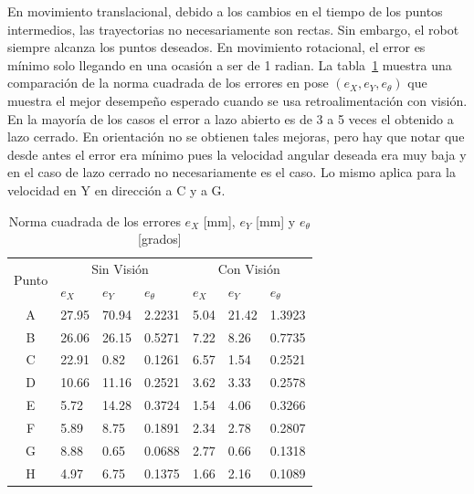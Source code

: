 \documentclass[twocolumn,10pt]{amrob}
\begin{document}
En movimiento translacional, debido a los cambios en el tiempo de los puntos intermedios, las trayectorias no necesariamente son rectas. Sin embargo, el robot siempre alcanza los puntos deseados. En movimiento rotacional, el error es mínimo solo llegando en una ocasión a ser de 1 radian. La tabla~\ref{tab:SinVisionConVision} muestra una comparación de la norma cuadrada de los errores en pose $(e_X,e_Y,e_\theta)$ que muestra el mejor desempeño esperado cuando se usa retroalimentación con visión. En la mayoría de los casos el error a lazo abierto es de 3 a 5 veces el obtenido a lazo cerrado. En orientación no se obtienen tales mejoras, pero hay que notar que desde antes el error era mínimo pues la velocidad angular deseada era muy baja y en el caso de lazo cerrado no necesariamente es el caso. Lo mismo aplica para la velocidad en Y en dirección a C y a G.


\begin{table}[t]
\begin{center}
\label{tab:SinVisionConVision}
\begin{tabular}{|c||l|l|l||l|l|l|}
\hline
\multirow{2}{*}{Punto} 
      & \multicolumn{3}{c||}{Sin Visión} 
          & \multicolumn{3}{|c|}{Con Visión} \\  \cline{2-7}
          
 & $e_X$ & $e_Y$ & $e_\theta$ & $e_X$ & $e_Y$ & $e_\theta$ \\
\hline
A & 27.95 & 70.94 & 2.2231  &  5.04 & 21.42 & 1.3923	\\
B & 26.06 & 26.15 & 0.5271  &  7.22 &  8.26 & 0.7735	\\
C & 22.91 &  0.82 & 0.1261  &  6.57 &  1.54 & 0.2521	\\
D & 10.66 & 11.16 & 0.2521  &  3.62 &  3.33 & 0.2578	\\
E &  5.72 & 14.28 & 0.3724  &  1.54 &  4.06 & 0.3266	\\
F &  5.89 &  8.75 & 0.1891  &  2.34 &  2.78 & 0.2807	\\
G &  8.88 &  0.65 & 0.0688  &  2.77 &  0.66 & 0.1318	\\
H &  4.97 &  6.75 & 0.1375  &  1.66 &  2.16 & 0.1089	\\
\hline
\end{tabular}
\end{center}
\caption{Norma cuadrada de los errores $e_X$ [mm],  $e_Y$ [mm] y $ e_\theta$ [grados]}
\end{table}
\end{document}
